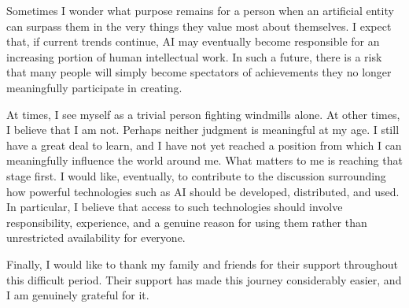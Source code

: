 Sometimes I wonder what purpose remains for a person when an artificial entity can surpass them in the very things they value most about themselves. I expect that, if current trends continue, AI may eventually become responsible for an increasing portion of human intellectual work. In such a future, there is a risk that many people will simply become spectators of achievements they no longer meaningfully participate in creating.

At times, I see myself as a trivial person fighting windmills alone. At other times, I believe that I am not. Perhaps neither judgment is meaningful at my age. I still have a great deal to learn, and I have not yet reached a position from which I can meaningfully influence the world around me. What matters to me is reaching that stage first. I would like, eventually, to contribute to the discussion surrounding how powerful technologies such as AI should be developed, distributed, and used. In particular, I believe that access to such technologies should involve responsibility, experience, and a genuine reason for using them rather than unrestricted availability for everyone.

Finally, I would like to thank my family and friends for their support throughout this difficult period. Their support has made this journey considerably easier, and I am genuinely grateful for it.

